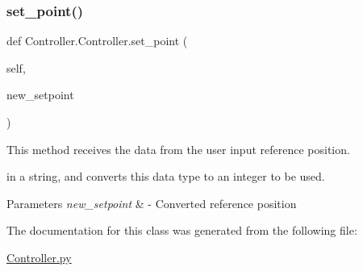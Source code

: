 \subsubsection{\texorpdfstring{set\+\_\+point()}{set\_point()}}
{\footnotesize\ttfamily def Controller.\+Controller.\+set\+\_\+point (\begin{DoxyParamCaption}\item[{}]{self,  }\item[{}]{new\+\_\+setpoint }\end{DoxyParamCaption})}



This method receives the data from the user input reference position. 

in a string, and converts this data type to an integer to be used.


\begin{DoxyParams}{Parameters}
{\em new\+\_\+setpoint} & -\/ Converted reference position \\
\hline
\end{DoxyParams}


The documentation for this class was generated from the following file\+:\begin{DoxyCompactItemize}
\item 
\mbox{\hyperlink{Controller_8py}{Controller.\+py}}\end{DoxyCompactItemize}
